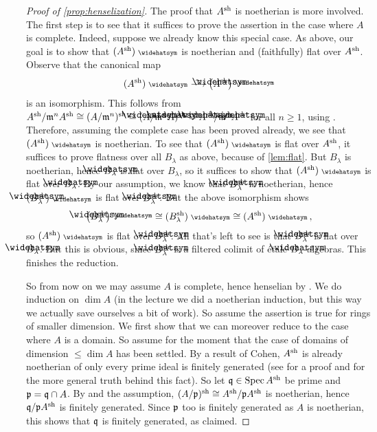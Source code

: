 \begin{proof}[Proof of \cref{prop:henselization}]
	The proof that $A^{\mathrm{sh}}$ is noetherian is more involved. The first step is to see that it suffices to prove the assertion in the case where $A$ is complete. Indeed, suppose we already know this special case. As above, our goal is to show that $(A^\sh)^\complete$ is noetherian and (faithfully) flat over $A^{\mathrm{sh}}$. Observe that the canonical map
	\begin{equation}\label{eq:AshComplete}
		(A^\sh)^\complete\isomorphism \big(\roof{A}^\sh\big)^\complete
	\end{equation}
	is an isomorphism. This follows from $A^\sh/\mm^nA^\sh\cong (A/\mm^n)^\sh\cong (\roof{A}/\mm^n\roof{A})^\sh\cong \roof{A}^\sh/\mm^n\roof{A}^\sh$ for all $n\geq 1$, using . Therefore, assuming the complete case has been proved already, we see that $(A^\sh)^\complete$ is noetherian. To see that $(A^\sh)^\complete$ is flat over $A^{\mathrm{sh}}$, it suffices to prove flatness over all $B_\lambda$ as above, because of \cref{lem:flat}. But $B_\lambda$ is noetherian, hence $\roof{B}_\lambda$ is flat over $B_\lambda$, so it suffices to show that $(A^\sh)^\complete$ is flat over $\roof{B}_\lambda$. By our assumption, we know that $\roof{B}_\lambda^\sh$ is noetherian, hence $(\roof{B}_\lambda^\sh)^\complete$ is flat over $\roof{B}_\lambda^\sh$. But the above isomorphism shows
	\begin{equation*}
		\big(\roof{B}_\lambda^\sh\big)^\complete\cong (B_\lambda^\sh)^\complete\cong (A^\sh)^\complete\,,
	\end{equation*}
	so $(A^\sh)^\complete$ is flat over $\roof{B}_\lambda^\sh$. All that's left to see is that $\roof{B}_\lambda^\sh$ is flat over $\roof{B}_\lambda$. But this is obvious, since $\roof{B}_\lambda^\sh$ is a filtered colimit of étale $\roof{B}_\lambda$-algebras. This finishes the reduction.
	
	So from now on we may assume $A$ is complete, hence henselian by . We do induction on $\dim A$ (in the lecture we did a noetherian induction, but this way we actually save ourselves a bit of work). So assume the assertion is true for rings of smaller dimension. We first show that we can moreover reduce to the case where $A$ is a domain. So assume for the moment that the case of domains of dimension $\leq \dim A$ has been settled. By a result of Cohen, $A^{\mathrm{sh}}$ is already noetherian of only every prime ideal is finitely generated (see \cite[Theorem~3.4]{matsumuraCRT} for a proof and \cite[]{stacks-project} for the more general truth behind this fact). So let $\mathfrak{q}\in\operatorname{Spec} A^{\mathrm{sh}}$ be prime and $\mathfrak{p}=\mathfrak{q}\cap A$. By  and the assumption, $(A/\mathfrak{p})^{\mathrm{sh}}\cong A^{\mathrm{sh}}/\mathfrak{p} A^{\mathrm{sh}}$ is noetherian, hence $\mathfrak{q}/\mathfrak{p} A^{\mathrm{sh}}$ is finitely generated. Since $\mathfrak{p}$ too is finitely generated as $A$ is noetherian, this shows that $\mathfrak{q}$ is finitely generated, as claimed.
	

\end{proof}
